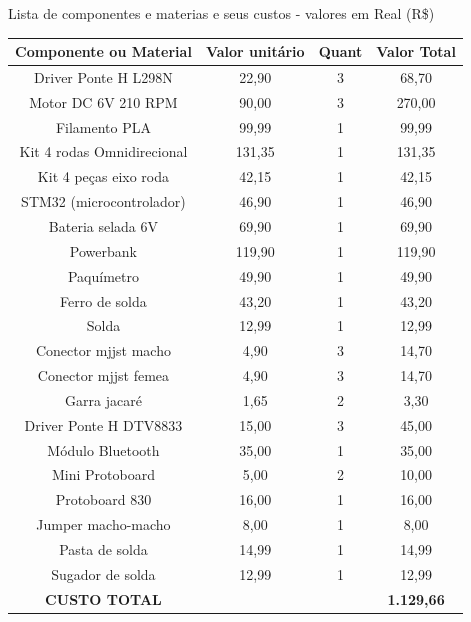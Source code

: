 \begin{quadro}[htb]
	\caption{Lista de componentes e materias e seus custos - valores em Real (R\$)}
	 \begin{tabular}{|c|c|c|c|}
		\hline
		\textbf{Componente ou Material} & \textbf{Valor unitário} & \textbf{Quant} & \textbf{Valor Total} \\ \hline
		Driver Ponte H L298N \cite{l298n_produto} &  22,90 & 3 &  68,70   \\ \hline
		Motor DC 6V 210 RPM \cite{motor_dc_6v_produto} &  90,00 & 3 &  270,00   \\ \hline
		Filamento PLA \cite{filamento_pla_produto} &  99,99 & 1 &  99,99   \\ \hline
		Kit 4 rodas Omnidirecional \cite{omin_wheel_produto} &  131,35 & 1 &  131,35   \\ \hline
		Kit 4 peças eixo roda \cite{omin_wheel_produto} &  42,15 & 1 &  42,15   \\ \hline
		STM32 (microcontrolador) \cite{stm32_produto} &  46,90 & 1 &  46,90   \\ \hline
		Bateria selada 6V \cite{bateria_6v_produto} &  69,90 & 1 &  69,90  \\ \hline
		Powerbank &  119,90 & 1 &  119,90   \\ \hline
		Paquímetro  &  49,90 & 1 &  49,90   \\ \hline
		Ferro de solda &  43,20 & 1 &  43,20   \\ \hline
		Solda &  12,99 & 1 &  12,99   \\ \hline
		Conector mjjst macho &  4,90 & 3 &  14,70   \\ \hline
		Conector mjjst femea &  4,90 & 3 &  14,70   \\ \hline
		Garra jacaré &  1,65 & 2 &  3,30   \\ \hline
		Driver Ponte H DTV8833 \cite{drv8833_produto} &  15,00 & 3 &  45,00   \\ \hline
		Módulo Bluetooth \cite{hc05_produto} &  35,00 & 1 &  35,00   \\ \hline
		Mini Protoboard &  5,00 & 2 &  10,00   \\ \hline
		Protoboard 830 &  16,00 & 1 &  16,00   \\ \hline
		Jumper macho-macho &  8,00 & 1 &  8,00   \\ \hline
		Pasta de solda &  14,99 & 1 &  14,99   \\ \hline
		Sugador de solda &  12,99 & 1 &  12,99   \\ \hline	
		\textbf{CUSTO TOTAL} & & & \textbf{ 1.129,66}   \\ \hline
	\end{tabular}
\end{quadro}


